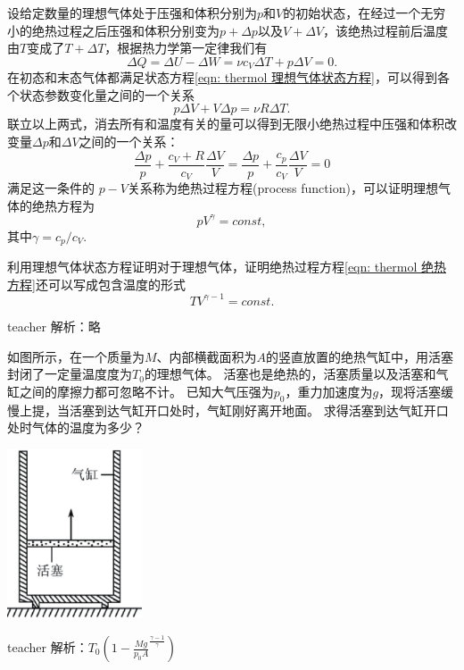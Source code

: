 设给定数量的理想气体处于压强和体积分别为$p$和$V$的初始状态，在经过一个无穷小的绝热过程之后压强和体积分别变为$p+\Delta p$以及$V+\Delta V$，该绝热过程前后温度由$T$变成了$T+\Delta T$，根据热力学第一定律我们有
\begin{equation}
\Delta Q = \Delta U-\Delta W = \nu c_V\Delta T +p\Delta V = 0.
\end{equation}
在初态和末态气体都满足状态方程\ref{eqn: thermol 理想气体状态方程}，可以得到各个状态参数变化量之间的一个关系
\begin{equation}
p\Delta V +V\Delta p = \nu R\Delta T.
\end{equation}
联立以上两式，消去所有和温度有关的量可以得到无限小绝热过程中压强和体积改变量$\Delta p$和$\Delta V$之间的一个关系：
\begin{equation}
\frac{\Delta p}{p}+\frac{c_V+R}{c_V}\frac{\Delta V}{V}=\frac{\Delta p}{p}+\frac{c_p}{c_V}\frac{\Delta V}{V}=0
\end{equation}
满足这一条件的 $p-V$关系称为绝热{\heiti 过程方程}(process function)，可以证明理想气体的绝热方程为
\begin{equation}\label{eqn: thermol 绝热方程}
pV^\gamma = const,
\end{equation}
其中$\gamma = c_p/c_V$.





\begin{example}
	利用理想气体状态方程证明对于理想气体，证明绝热过程方程\ref{eqn: thermol 绝热方程}还可以写成包含温度的形式
	\[TV^{\gamma-1} = const.\]
	\begin{taggedblock}{teacher}
		\noindent
		解析：略
	\end{taggedblock}
\end{example}

\begin{example}
如图所示，在一个质量为$M$、内部横截面积为$ A$的竖直放置的绝热气缸中，用活塞封闭了一定量温度度为$T_0$的理想气体。
活塞也是绝热的，活塞质量以及活塞和气缸之间的摩擦力都可忽略不计。
已知大气压强为$p_0$，重力加速度为$g$，现将活塞缓慢上提，当活塞到达气缸开口处时，气缸刚好离开地面。
求得活塞到达气缸开口处时气体的温度为多少？
	\begin{flushright}
		\includegraphics[width = 0.3\textwidth]{images/thermal-16.pdf} 
	\end{flushright}
\begin{taggedblock}{teacher}
\noindent
解析：$T_0(1-\frac{Mg}{p_0A}^\frac{\gamma-1}{\gamma})$
\end{taggedblock}
\end{example}

